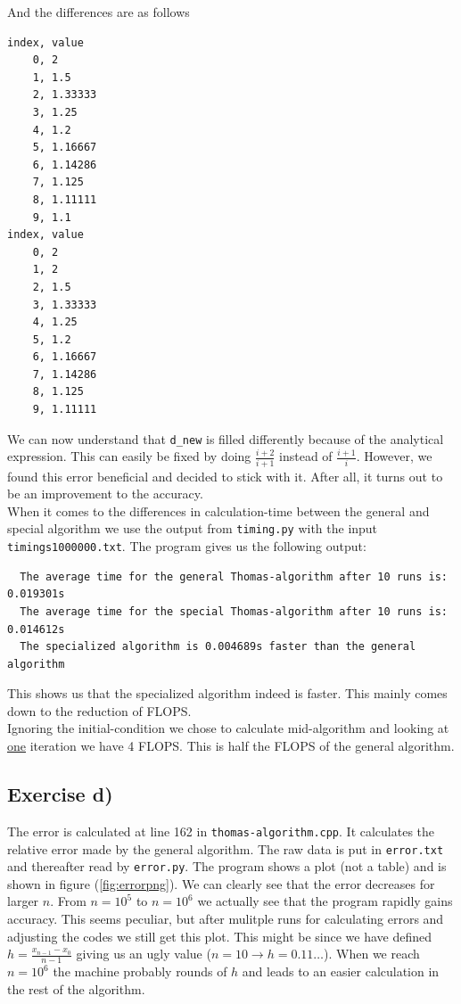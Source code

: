\documentclass{article}
\begin{document}
  And the differences are as follows

  \begin{verbatim}
index, value
    0, 2
    1, 1.5
    2, 1.33333
    3, 1.25
    4, 1.2
    5, 1.16667
    6, 1.14286
    7, 1.125
    8, 1.11111
    9, 1.1
index, value
    0, 2
    1, 2
    2, 1.5
    3, 1.33333
    4, 1.25
    5, 1.2
    6, 1.16667
    7, 1.14286
    8, 1.125
    9, 1.11111
  \end{verbatim}

  We can now understand that \texttt{d\_new} is filled differently because of the analytical expression. This can easily be fixed by doing $\frac{i+2}{i+1}$ instead of $\frac{i+1}{i}$. However, we found this error beneficial and decided to stick with it. After all, it turns out to be an improvement to the accuracy. \\

  When it comes to the differences in calculation-time between the general and special algorithm we use the output from \texttt{timing.py} with the input \texttt{timings1000000.txt}. The program gives us the following output:

  \begin{verbatim}
  The average time for the general Thomas-algorithm after 10 runs is: 0.019301s
  The average time for the special Thomas-algorithm after 10 runs is: 0.014612s
  The specialized algorithm is 0.004689s faster than the general algorithm
  \end{verbatim}

  This shows us that the specialized algorithm indeed is faster. This mainly comes down to the reduction of FLOPS.\\

  Ignoring the initial-condition we chose to calculate mid-algorithm and looking at \underline{one} iteration we have 4 FLOPS. This is half the FLOPS of the general algorithm.

  \subsection{Exercise d)} \label{sec:Results d)}

  The error is calculated at line 162 in \texttt{thomas-algorithm.cpp}. It calculates the relative error made by the general algorithm. The raw data is put in \texttt{error.txt} and thereafter read by \texttt{error.py}. The program shows a plot (not a table) and is shown in figure (\ref{fig:errorpng}). We can clearly see that the error decreases for larger $n$. From $n=10^5$ to $n=10^6$ we actually see that the program rapidly gains accuracy. This seems peculiar, but after mulitple runs for calculating errors and adjusting the codes we still get this plot. This might be since we have defined $h=\frac{x_{n-1}-x_0}{n-1}$ giving us an ugly value ($n=10 \rightarrow{} h=0.11 \hdots$). When we reach $n=10^6$ the machine probably rounds of $h$ and leads to an easier calculation in the rest of the algorithm.\\
\end{document}
